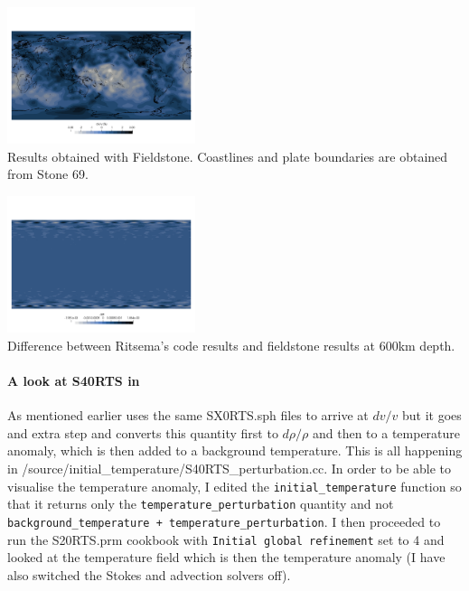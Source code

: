 \begin{center}
\includegraphics[width=5.5cm]{python_codes/fieldstone_85/images/fieldstone/fieldstone_S40RTS_2891km.png}\\
{\captionfont Results obtained with Fieldstone. Coastlines and plate boundaries are obtained from Stone 69.}
\end{center}

\begin{center}
\includegraphics[width=5.5cm]{python_codes/fieldstone_85/images/fieldstone/diff_600km_S40RTS.png}\\
{\captionfont Difference between Ritsema's code results and fieldstone results at 600\si{km} depth.}
\end{center}

\newpage
\paragraph{A look at S40RTS in \aspect} As mentioned earlier \aspect{} uses 
the same {\filenamefont SX0RTS.sph} files to arrive at $dv/v$ but it goes and extra 
step and converts this quantity first to $d\rho/\rho$ and then to a temperature 
anomaly, which is then added to a background temperature.
This is all happening in {\filenamefont /source/initial\_temperature/S40RTS\_perturbation.cc}.
In order to be able to visualise the temperature anomaly, I 
edited the \texttt{initial\_temperature} function so that it returns only the 
\texttt{temperature\_perturbation} quantity and not \texttt{background\_temperature + temperature\_perturbation}.
I then proceeded to run the {\filenamefont S20RTS.prm} cookbook with \texttt{Initial global refinement} set to 4
and looked at the temperature field which is then 
the temperature anomaly (I have also switched the Stokes and advection solvers off).

